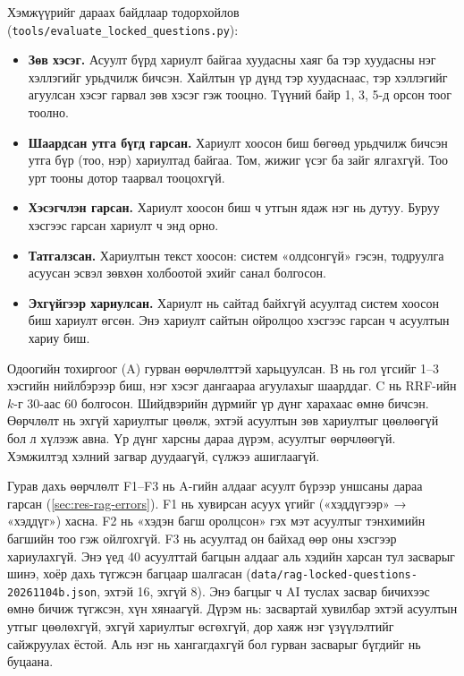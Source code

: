 Хэмжүүрийг дараах байдлаар тодорхойлов (\texttt{tools/\allowbreak evaluate\_locked\_questions.py}):
\begin{itemize}
    \item \textbf{Зөв хэсэг.} Асуулт бүрд хариулт байгаа хуудасны хаяг ба тэр хуудасны нэг хэллэгийг урьдчилж бичсэн. Хайлтын үр дүнд тэр хуудаснаас, тэр хэллэгийг агуулсан хэсэг гарвал зөв хэсэг гэж тооцно. Түүний байр 1, 3, 5-д орсон тоог тоолно.
    \item \textbf{Шаардсан утга бүгд гарсан.} Хариулт хоосон биш бөгөөд урьдчилж бичсэн утга бүр (тоо, нэр) хариултад байгаа. Том, жижиг үсэг ба зайг ялгахгүй. Тоо урт тооны дотор таарвал тооцохгүй.
    \item \textbf{Хэсэгчлэн гарсан.} Хариулт хоосон биш ч утгын ядаж нэг нь дутуу. Буруу хэсгээс гарсан хариулт ч энд орно.
    \item \textbf{Татгалзсан.} Хариултын текст хоосон: систем «олдсонгүй» гэсэн, тодруулга асуусан эсвэл зөвхөн холбоотой эхийг санал болгосон.
    \item \textbf{Эхгүйгээр хариулсан.} Хариулт нь сайтад байхгүй асуултад систем хоосон биш хариулт өгсөн. Энэ хариулт сайтын ойролцоо хэсгээс гарсан ч асуултын хариу биш.
\end{itemize}

Одоогийн тохиргоог (A) гурван өөрчлөлттэй харьцуулсан. B нь гол үгсийг 1--3 хэсгийн нийлбэрээр биш, нэг хэсэг дангаараа агуулахыг шаарддаг. C нь RRF-ийн $k$-г 30-аас 60 болгосон. Шийдвэрийн дүрмийг үр дүнг харахаас өмнө бичсэн. Өөрчлөлт нь эхгүй хариултыг цөөлж, эхтэй асуултын зөв хариултыг цөөлөөгүй бол л хүлээж авна. Үр дүнг харсны дараа дүрэм, асуултыг өөрчлөөгүй. Хэмжилтэд хэлний загвар дуудаагүй, сүлжээ ашиглаагүй.

Гурав дахь өөрчлөлт F1--F3 нь A-гийн алдааг асуулт бүрээр уншсаны дараа гарсан (\ref{sec:res-rag-errors}). F1 нь хувирсан асуух үгийг («хэддүгээр» → «хэддүг») хасна. F2 нь «хэдэн багш оролцсон» гэх мэт асуултыг тэнхимийн багшийн тоо гэж ойлгохгүй. F3 нь асуултад он байхад өөр оны хэсгээр хариулахгүй. Энэ үед 40 асуулттай багцын алдааг аль хэдийн харсан тул засварыг шинэ, хоёр дахь түгжсэн багцаар шалгасан (\texttt{data/\allowbreak rag-locked-questions-20261104b.json}, эхтэй 16, эхгүй 8). Энэ багцыг ч AI туслах засвар бичихээс өмнө бичиж түгжсэн, хүн хянаагүй. Дүрэм нь: засвартай хувилбар эхтэй асуултын утгыг цөөлөхгүй, эхгүй хариултыг өсгөхгүй, дор хаяж нэг үзүүлэлтийг сайжруулах ёстой. Аль нэг нь хангагдахгүй бол гурван засварыг бүгдийг нь буцаана.

